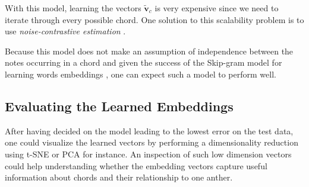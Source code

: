 \documentclass[12pt]{article}\pagestyle{myheadings}
\begin{document}
\noindent With this model, learning the vectors $\tilde{\boldsymbol v}_c$ is very expensive since we need to iterate through every possible chord. One solution to this scalability problem is to use \textit{noise-contrastive estimation} \citep{NIPS2013_5165}.  

Because this model does not make an assumption of independence between the notes occurring in a chord and given the success of the Skip-gram model for learning words embeddings \citep{mik2013}, one can expect such a model to perform well.


\subsection*{Evaluating the Learned Embeddings}
After having decided on the model leading to the lowest error on the test data, one could visualize the learned vectors by performing a dimensionality reduction using t-SNE or PCA for instance. An inspection of such low dimension vectors could help understanding whether the embedding vectors capture useful information about chords and their relationship to one anther. 


 
\end{document}
